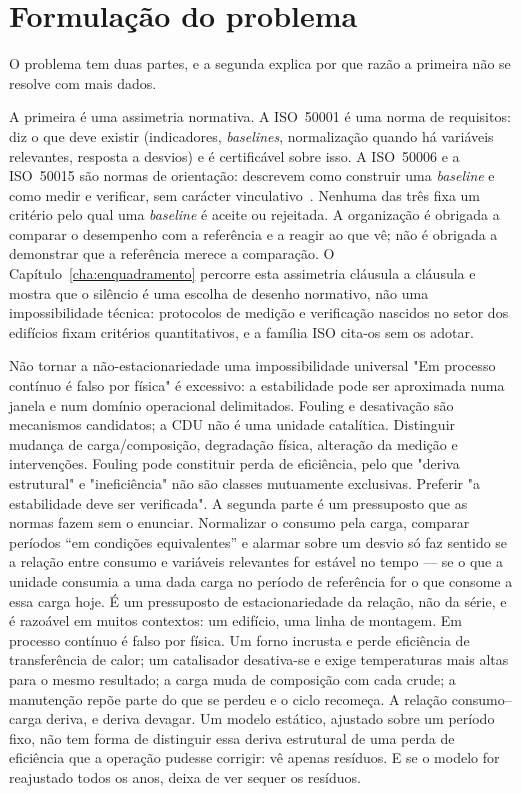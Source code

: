 \section{Formulação do problema}
\label{sec:problema}

O problema tem duas partes, e a segunda explica por que razão a
primeira não se resolve com mais dados.

A primeira é uma assimetria normativa. A ISO~50001 é uma norma de
requisitos: diz o que deve existir (indicadores, \emph{baselines},
normalização quando há variáveis relevantes, resposta a desvios) e é
certificável sobre isso. A ISO~50006 e a ISO~50015 são normas de
orientação: descrevem como construir uma \emph{baseline} e como medir e
verificar, sem carácter vinculativo~\cite{ISO50006_2014,ISO50015_2014}.
Nenhuma das três fixa um critério pelo qual uma \emph{baseline} é aceite
ou rejeitada. A organização é obrigada a comparar o desempenho com a
referência e a reagir ao que vê; não é obrigada a demonstrar que a
referência merece a comparação. O Capítulo~\ref{cha:enquadramento}
percorre esta assimetria cláusula a cláusula e mostra que o silêncio é
uma escolha de desenho normativo, não uma impossibilidade técnica:
protocolos de medição e verificação nascidos no setor dos edifícios
fixam critérios quantitativos, e a família ISO cita-os sem os adotar.

{Não tornar a não-estacionariedade uma impossibilidade universal}
{"Em processo contínuo é falso por física" é excessivo: a estabilidade pode
ser aproximada numa janela e num domínio operacional delimitados.
Fouling e desativação são mecanismos candidatos; a CDU não é uma unidade
catalítica. Distinguir mudança de carga/composição, degradação física,
alteração da medição e intervenções. Fouling pode constituir perda de
eficiência, pelo que "deriva estrutural" e "ineficiência" não são classes
mutuamente exclusivas. Preferir "a estabilidade deve ser verificada".}%
A segunda parte é um pressuposto que as normas fazem sem o enunciar.
Normalizar o consumo pela carga, comparar períodos \enquote{em condições
equivalentes} e alarmar sobre um desvio só faz sentido se a relação
entre consumo e variáveis relevantes for estável no tempo --- se o que
a unidade consumia a uma dada carga no período de referência for o que
consome a essa carga hoje. É um pressuposto de estacionariedade da
relação, não da série, e é razoável em muitos contextos: um edifício,
uma linha de montagem. Em processo contínuo é falso por física. Um
forno incrusta e perde eficiência de transferência de calor; um
catalisador desativa-se e exige temperaturas mais altas para o mesmo
resultado; a carga muda de composição com cada crude; a manutenção
repõe parte do que se perdeu e o ciclo recomeça. A relação
consumo--carga deriva, e deriva devagar. Um modelo estático, ajustado
sobre um período fixo, não tem forma de distinguir essa deriva
estrutural de uma perda de eficiência que a operação pudesse corrigir:
vê apenas resíduos. E se o modelo for reajustado todos os anos, deixa
de ver sequer os resíduos.

